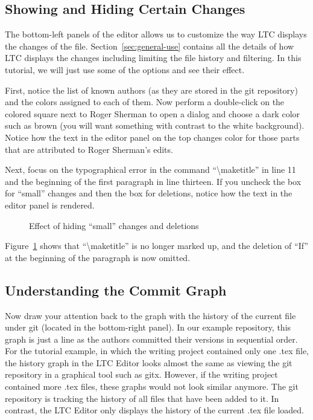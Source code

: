 \subsection{Showing and Hiding Certain Changes}

The bottom-left panels of the editor allows us to customize the way LTC displays the changes of the file.  Section~\ref{sec:general-use} contains all the details of how LTC displays the changes including limiting the file history and filtering.  In this tutorial, we will just use some of the options and see their effect.

First, notice the list of known authors (as they are stored in the git repository) and the colors assigned to each of them.  Now perform a double-click on the colored square next to Roger Sherman to open a dialog and  choose a dark color such as brown (you will want something with contrast to the white background).  Notice how the text in the editor panel on the top changes color for those parts that are attributed to Roger Sherman's edits.

Next, focus on the typographical error in the command ``\textbackslash maketitle'' in line 11 and the beginning of the first paragraph in line thirteen.  If you uncheck the box for ``small'' changes and then the box for deletions, notice how the text in the editor panel is rendered.
\begin{figure}[t]
\centering
{}
\hspace{2ex}
\hspace{2ex}
\caption{Effect of hiding ``small'' changes and deletions} \label{fig:editor-filter-small}
\end{figure}
Figure~\ref{fig:editor-filter-small} shows that ``\textbackslash maketitle'' is no longer marked up, and the deletion of ``If'' at the beginning of the paragraph is now omitted.

\subsection{Understanding the Commit Graph}

Now draw your attention back to the graph with the history of the current file under git (located in the bottom-right panel).  In our example repository, this graph is just a line as the authors committed their versions in sequential order.  For the tutorial example, in which the writing project contained only one .tex file, the history graph in the LTC Editor looks almost the same as viewing the git repository in a graphical tool such as gitx.  However, if the writing project contained more .tex files, these graphs would not look similar anymore.  The git repository is tracking the history of all files that have been added to it.  In contrast, the LTC Editor only displays the history of the current .tex file loaded.

